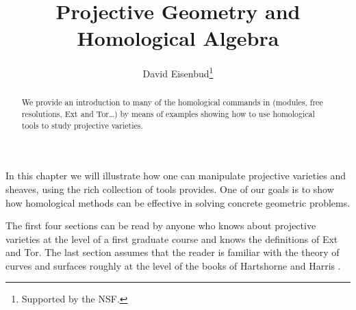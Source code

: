 

\title{Projective Geometry and Homological Algebra}
\author{David Eisenbud\thanks{Supported by the NSF.}}

\maketitle

\begin{abstract}
We provide an introduction to many of the homological
commands in \Mtwo (modules, free resolutions, Ext and Tor\dots)
by means of examples showing how to use homological tools to
study projective varieties.
\end{abstract}

% 
\def\P{{\mathbb P}} %
\def\Z{{\mathbb Z}} %
\def\H{{\rm H}}
\def\cO{{\cal O}}
\def\O{{\cal O}}
\def\iso{{\cong}}

In this chapter we will illustrate how one can 
manipulate
projective varieties and sheaves,
using the rich collection of tools
\Mtwo provides.
One of our goals is to show how homological
methods can be effective in solving concrete geometric problems.

The first four sections can be read by anyone who knows about
projective varieties at the level of a first graduate course
and knows the definitions of Ext and Tor. The last section assumes
that the reader is familiar with the theory of curves and surfaces
roughly at the level of the books of Hartshorne \cite{Hartshorne} and 
Harris \cite{Harris}.

